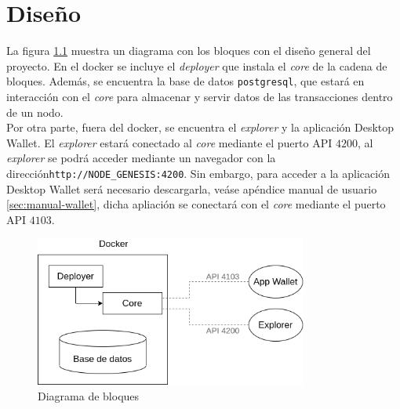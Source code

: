 \chapter{Diseño}
\label{sec:diseno}




La figura \ref{fig:diag-bloques} muestra un diagrama con los bloques con el diseño general del proyecto. En el docker se incluye el \textit{deployer} que instala el \textit{core} de la cadena de bloques. Además, se encuentra la base de datos \texttt{postgresql}, que estará en interacción con el \textit{core} para almacenar y servir datos de las transacciones dentro de un nodo\cite{BD-ARK}.\\

Por otra parte, fuera del docker, se encuentra el \textit{explorer} y la aplicación Desktop Wallet. El \textit{explorer} estará conectado al \textit{core} mediante el puerto API $4200$, al \textit{explorer} se podrá acceder mediante un navegador con la dirección\mbox{\texttt{http://NODE\_GENESIS:4200}}. Sin embargo, para acceder a la aplicación Desktop Wallet será necesario descargarla, veáse apéndice manual de usuario \ref{sec:manual-wallet}, dicha apliación se conectará con el \textit{core} mediante el puerto API $4103$.


\begin{figure}[H]
	\centering
	\includegraphics[width=0.8\textwidth]{figuras/diagrama_bloquesARK.png}
	\caption{Diagrama de bloques}
	\label{fig:diag-bloques}
\end{figure}


